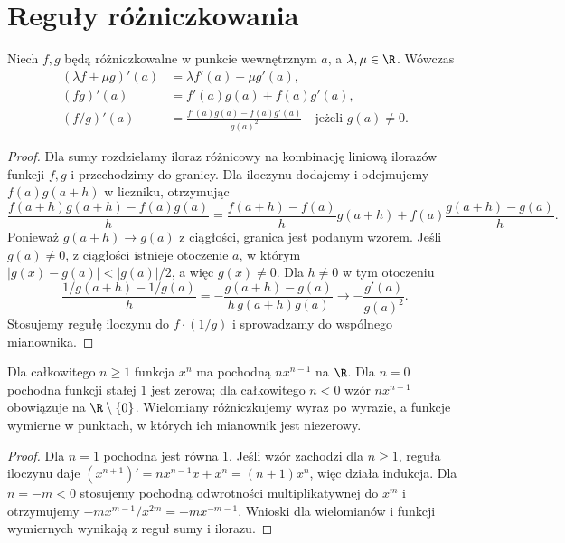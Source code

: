 \section{Reguły różniczkowania}
\begin{twierdzenie}
\label{ma1:thm:derivative-algebra}
Niech $f,g$ będą różniczkowalne w punkcie wewnętrznym $a$, a $\lambda,\mu\in\R$. Wówczas
\begin{align*}
 (\lambda f+\mu g)'(a)&=\lambda f'(a)+\mu g'(a),\\
 (fg)'(a)&=f'(a)g(a)+f(a)g'(a),\\
 (f/g)'(a)&=\frac{f'(a)g(a)-f(a)g'(a)}{g(a)^2}
 \quad\text{jeżeli }g(a)\ne0.
\end{align*}
\end{twierdzenie}
\begin{proof}
Dla sumy rozdzielamy iloraz różnicowy na kombinację liniową ilorazów funkcji $f,g$ i przechodzimy do granicy. Dla iloczynu dodajemy i odejmujemy $f(a)g(a+h)$ w liczniku, otrzymując
\[
 \frac{f(a+h)g(a+h)-f(a)g(a)}h
 =\frac{f(a+h)-f(a)}h g(a+h)
 +f(a)\frac{g(a+h)-g(a)}h.
\]
Ponieważ $g(a+h)\to g(a)$ z ciągłości, granica jest podanym wzorem. Jeśli $g(a)\ne0$, z ciągłości istnieje otoczenie $a$, w którym $|g(x)-g(a)|<|g(a)|/2$, a więc $g(x)\ne0$. Dla $h\ne0$ w tym otoczeniu
\[
 \frac{1/g(a+h)-1/g(a)}h
 =-\frac{g(a+h)-g(a)}{h\,g(a+h)g(a)}
 \longrightarrow-\frac{g'(a)}{g(a)^2}.
\]
Stosujemy regułę iloczynu do $f\cdot(1/g)$ i sprowadzamy do wspólnego mianownika.
\end{proof}
\begin{wniosek}
\label{ma1:cor:integer-power-derivative}
Dla całkowitego $n\ge1$ funkcja $x^n$ ma pochodną $nx^{n-1}$ na $\R$. Dla $n=0$ pochodna funkcji stałej $1$ jest zerowa; dla całkowitego $n<0$ wzór $nx^{n-1}$ obowiązuje na $\R\setminus\{0\}$. Wielomiany różniczkujemy wyraz po wyrazie, a funkcje wymierne w punktach, w których ich mianownik jest niezerowy.
\end{wniosek}
\begin{proof}
Dla $n=1$ pochodna jest równa $1$. Jeśli wzór zachodzi dla $n\ge1$, reguła iloczynu daje $(x^{n+1})'=nx^{n-1}x+x^n=(n+1)x^n$, więc działa indukcja. Dla $n=-m<0$ stosujemy pochodną odwrotności multiplikatywnej do $x^m$ i otrzymujemy $-mx^{m-1}/x^{2m}=-mx^{-m-1}$. Wnioski dla wielomianów i funkcji wymiernych wynikają z reguł sumy i ilorazu.
\end{proof}

